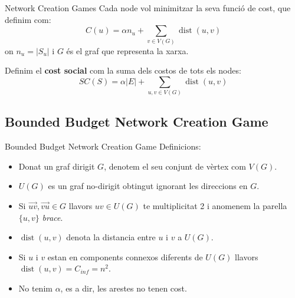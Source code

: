 \documentclass[aspectratio=169]{beamer}
\DeclareMathOperator{\dist}{dist}
\begin{document}
\begin{frame}{Network Creation Games}
    Cada node vol minimitzar la seva funció de cost, que definim com:
    \begin{equation*}
        C(u) = \alpha n_u + \sum_{v \in V(G)}\dist(u,v)
    \end{equation*}
    on $n_u = |S_u|$ i $G$ és el graf que representa la xarxa.
    
    \vspace{3mm}
    
    Definim el \textbf{cost social} com la suma dels costos de tots els nodes:
    \begin{equation*}
        SC(S) = \alpha |E| + \sum_{u,v \in V(G)} \dist(u,v)
    \end{equation*}
\end{frame}

\subsection{Bounded Budget Network Creation Game}
\begin{frame}{Bounded Budget Network Creation Game}
Definicions:
\begin{itemize}
    \item<1-> Donat un graf dirigit $G$, denotem el seu conjunt de vèrtex com $V(G)$.
    \item<2-> $U(G)$ es un graf no-dirigit obtingut ignorant les direccions en $G$.
    \item<3-> Si $\vec{uv}, \vec{vu} \in G$ llavors $uv \in U(G)$ te multiplicitat 2 i
        anomenem la parella $\{u, v\}$ \emph{brace}.
    \item<4-> $\dist(u, v)$ denota la distancia entre $u$ i $v$ a $U(G)$.
    \item<5-> Si $u$ i $v$ estan en components connexos diferents de $U(G)$ llavors
        $\dist(u, v) = C_{inf} = n^2$.
    \item<6-> No tenim $\alpha$, es a dir, les arestes no tenen cost.
        
    
\end{itemize}
\end{frame} 
\end{document}
